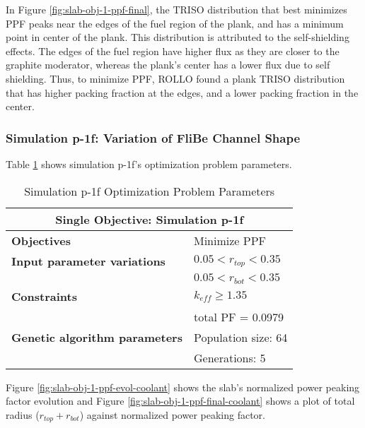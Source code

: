 In Figure \ref{fig:slab-obj-1-ppf-final}, the TRISO distribution that best minimizes 
PPF peaks near the edges of the fuel region of the plank, and has a minimum point in 
center of the plank.
This distribution is attributed to the self-shielding effects. 
The edges of the fuel region have higher flux as they are closer to the graphite 
moderator, whereas the plank's center has a lower flux due to self shielding. 
Thus, to minimize PPF, \gls{ROLLO} found a plank TRISO distribution that has higher 
packing fraction at the edges, and a lower packing fraction in the center. 

\subsubsection{Simulation p-1f: Variation of FliBe Channel Shape}
Table \ref{tab:simulationp1f} shows simulation p-1f's optimization problem parameters. 
\begin{table}[htbp!]
    \centering
    \onehalfspacing
    \caption{Simulation p-1f Optimization Problem Parameters}
	\label{tab:simulationp1f}
    \footnotesize
    \begin{tabular}{l|p{3cm}}
    \hline 
    \multicolumn{2}{c}{\textbf{Single Objective: Simulation p-1f}} \\
    \hline 
    \textbf{Objectives} & Minimize PPF \\
    \hline 
    \textbf{Input parameter variations} & $0.05<r_{top}<0.35$ \\
    & $0.05<r_{bot}<0.35$ \\
    \hline
    \textbf{Constraints} & $k_{eff} \geq 1.35$\\ 
    & total PF = 0.0979\\
    \hline 
    \textbf{Genetic algorithm parameters} & Population size: 64 \\
    & Generations: 5 \\
    \hline
    \end{tabular}
\end{table}
Figure \ref{fig:slab-obj-1-ppf-evol-coolant} shows the slab's normalized power peaking 
factor evolution and Figure \ref{fig:slab-obj-1-ppf-final-coolant} shows a plot of total 
radius ($r_{top} + r_{bot}$) against normalized power peaking factor. 

